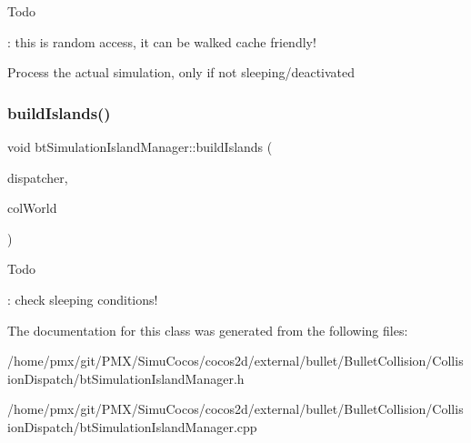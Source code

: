 \begin{DoxyRefDesc}{Todo}
\item[\hyperlink{todo__todo000017}{Todo}]\+: this is random access, it can be walked \textquotesingle{}cache friendly\textquotesingle{}! \end{DoxyRefDesc}
Process the actual simulation, only if not sleeping/deactivated \mbox{\label{classbtSimulationIslandManager_aea0b5869eca2d034ac9c643e149a5e01}} 
\subsubsection{\texorpdfstring{build\+Islands()}{buildIslands()}}
{\footnotesize\ttfamily void bt\+Simulation\+Island\+Manager\+::build\+Islands (\begin{DoxyParamCaption}\item[{\hyperlink{classbtDispatcher}{bt\+Dispatcher} $\ast$}]{dispatcher,  }\item[{\hyperlink{classbtCollisionWorld}{bt\+Collision\+World} $\ast$}]{col\+World }\end{DoxyParamCaption})}

\begin{DoxyRefDesc}{Todo}
\item[\hyperlink{todo__todo000016}{Todo}]\+: check sleeping conditions! \end{DoxyRefDesc}


The documentation for this class was generated from the following files\+:\begin{DoxyCompactItemize}
\item 
/home/pmx/git/\+P\+M\+X/\+Simu\+Cocos/cocos2d/external/bullet/\+Bullet\+Collision/\+Collision\+Dispatch/bt\+Simulation\+Island\+Manager.\+h\item 
/home/pmx/git/\+P\+M\+X/\+Simu\+Cocos/cocos2d/external/bullet/\+Bullet\+Collision/\+Collision\+Dispatch/bt\+Simulation\+Island\+Manager.\+cpp\end{DoxyCompactItemize}
